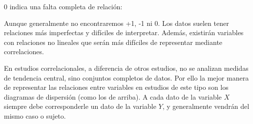 \documentclass[a4paper,12pt]{article}
\begin{document}
\begin{figure}[!ht]
  \begin{center}
  \end{center}
\end{figure}

0 indica una falta completa de relación:

\begin{figure}[!ht]
  \begin{center}
  \end{center}
\end{figure}

Aunque generalmente no encontraremos +1, -1 ni 0. Los datos suelen tener relaciones más imperfectas y difíciles de interpretar. Además, existirán variables con relaciones no lineales que serán más difíciles de representar mediante correlaciones.

En estudios correlacionales, a diferencia de otros estudios, no se analizan medidas de tendencia central, sino conjuntos completos de datos. Por ello la mejor manera de representar las relaciones entre variables en estudios de este tipo son los diagramas de dispersión (como los de arriba). A cada dato de la variable $X$ siempre debe corresponderle un dato de la variable $Y$, y generalmente vendrán del mismo caso o sujeto.
\end{document}
